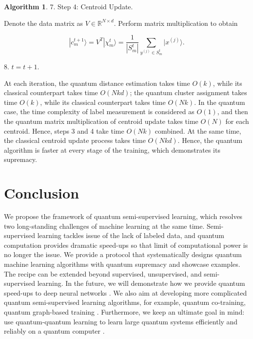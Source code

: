 \documentclass[11pt]{article}
\theoremstyle{definition}
\newtheorem{algorithm}{Algorithm}[section]
\def\xsj{x^{(j)}}
\def\ysj{y^{(j)}}
\begin{document}
\begin{algorithm}
7. Step 4: Centroid Update.

Denote the data matrix as $V \in \mathbb{R}^{N \times d}$. Perform matrix multiplication to obtain

\begin{equation*}
    |c_m^{t+1}\rangle = V^T |\chi_m^t\rangle =  \frac{1}{|S_m^t|} \sum_{\ysj \in S_m^t} |\xsj\rangle.
\end{equation*}


8. $t = t+1.$

At each iteration, the quantum distance estimation takes time $O(k)$, while its classical counterpart takes time $O(N k d)$; the quantum cluster assignment takes time $O(k)$, while its classical counterpart takes time $O(N k)$. In the quantum case, the time complexity of label measurement is considered as $O(1)$, and then the quantum matrix multiplication of centroid update takes time $O(N)$ for each centroid. Hence, steps 3 and 4 take time $O(N k)$ combined. At the same time, the classical centroid update process takes time $O(N k d)$. 
Hence, the quantum algorithm is faster at every stage of the training, which demonstrates its supremacy. 



\end{algorithm}









\section{Conclusion}

We propose the framework of quantum semi-supervised learning, which resolves two long-standing challenges of machine learning at the same time. Semi-supervised learning tackles issue of the lack of labeled data, and quantum computation provides dramatic speed-ups so that limit of computational power is no longer the issue. We provide a protocol that systematically designs quantum machine learning algorithms with quantum supremacy and showcase examples. The recipe can be extended beyond supervised, unsupervised, and semi-supervised learning. In the future, we will demonstrate how we provide quantum speed-ups to deep neural networks \cite{shangnan2021d}.  
We also aim at developing more complicated quantum semi-supervised learning algorithms, for example, quantum co-training, quantum graph-based training \cite{shangnan2021s}. 
Furthermore, we keep an ultimate goal in mind: use quantum-quantum learning to learn large quantum systems efficiently and reliably on a quantum computer \cite{shangnan2021qml}.
\end{document}
